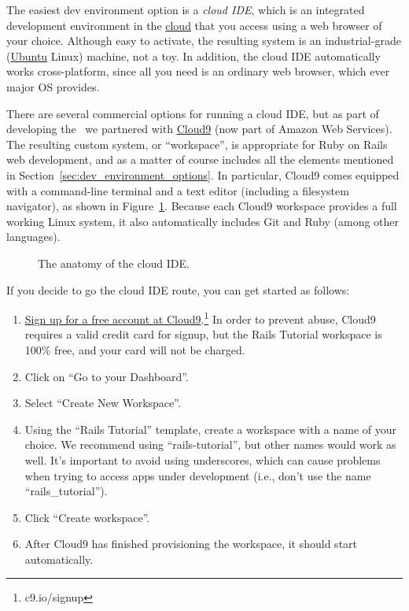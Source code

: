 The easiest dev environment option is a \emph{cloud IDE}, which is an integrated development environment in the \href{https://en.wikipedia.org/wiki/Cloud_computing}{cloud} that you access using a web browser of your choice. Although easy to activate, the resulting system is an industrial-grade (\href{https://www.ubuntu.com/}{Ubuntu} Linux) machine, not a toy. In addition, the cloud IDE automatically works cross-platform, since all you need is an ordinary web browser, which ever major OS provides.

There are several commercial options for running a cloud IDE, but as part of developing the \rort\ we partnered with \href{http://c9.io/}{Cloud9} (now part of Amazon Web Services). The resulting custom system, or ``workspace'', is appropriate for Ruby on Rails web development, and as a matter of course includes all the elements mentioned in Section~\ref{sec:dev_environment_options}. In particular, Cloud9 comes equipped with a command-line terminal and a text editor (including a filesystem navigator), as shown in Figure~\ref{fig:ide_anatomy}. Because each Cloud9 workspace provides a full working Linux system, it also automatically includes Git and Ruby (among other languages).

\begin{figure}
\begin{center}
\end{center}
\caption{The anatomy of the cloud IDE.\label{fig:ide_anatomy}}
\end{figure}

If you decide to go the cloud IDE route, you can get started as follows:
\begin{enumerate}
\item \href{https://c9.io/web/sign-up/free}{Sign up for a free account at Cloud9}.\footnote{c9.io/signup} In order to prevent abuse, Cloud9 requires a valid credit card for signup, but the Rails Tutorial workspace is 100\% free, and your card will not be charged.
\item Click on ``Go to your Dashboard''.
\item Select ``Create New Workspace''.
\item Using the ``Rails Tutorial'' template, create a workspace with a name of your choice. We recommend using ``rails-tutorial'', but other names would work as well. It's important to avoid using underscores, which can cause problems when trying to access apps under development (i.e., don't use the name ``rails\_tutorial'').
\item Click ``Create workspace''.
\item After Cloud9 has finished provisioning the workspace, it should start automatically.
\end{enumerate}

